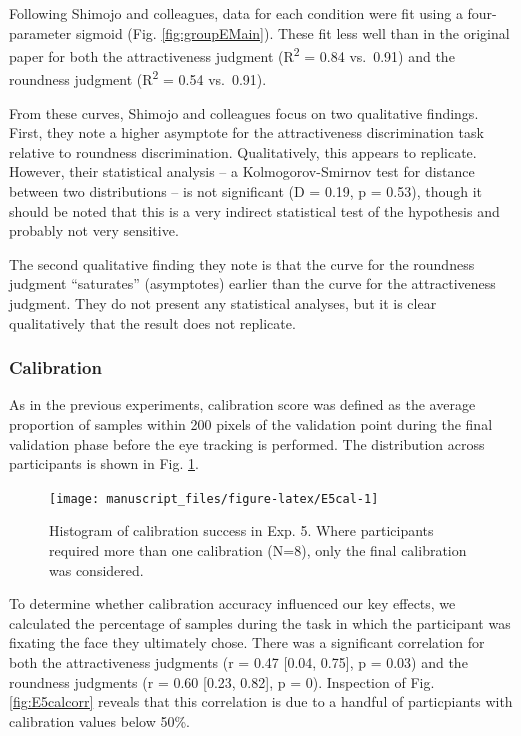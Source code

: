\documentclass[
  man,floatsintext]{apa6}
\begin{document}
Following Shimojo and colleagues, data for each condition were fit using a four-parameter sigmoid (Fig. \ref{fig:groupEMain}). These fit less well than in the original paper for both the attractiveness judgment (R\textsuperscript{2} = 0.84 vs.~0.91) and the roundness judgment (R\textsuperscript{2} = 0.54 vs.~0.91).

From these curves, Shimojo and colleagues focus on two qualitative findings. First, they note a higher asymptote for the attractiveness discrimination task relative to roundness discrimination. Qualitatively, this appears to replicate. However, their statistical analysis -- a Kolmogorov-Smirnov test for distance between two distributions -- is not significant (D = 0.19, p = 0.53), though it should be noted that this is a very indirect statistical test of the hypothesis and probably not very sensitive.

The second qualitative finding they note is that the curve for the roundness judgment ``saturates'' (asymptotes) earlier than the curve for the attractiveness judgment. They do not present any statistical analyses, but it is clear qualitatively that the result does not replicate.

\hypertarget{calibration-5}{%
\subsubsection{Calibration}\label{calibration-5}}

As in the previous experiments, calibration score was defined as the average proportion of samples within 200 pixels of the validation point during the final validation phase before the eye tracking is performed. The distribution across participants is shown in Fig. \ref{fig:E5cal}.


\begin{figure}
\texttt{[image: manuscript\_files/figure-latex/E5cal-1]} \caption{Histogram of calibration success in Exp. 5. Where participants required more than one calibration (N=8), only the final calibration was considered.}\label{fig:E5cal}
\end{figure}

To determine whether calibration accuracy influenced our key effects, we calculated the percentage of samples during the task in which the participant was fixating the face they ultimately chose. There was a significant correlation for both the attractiveness judgments (r = 0.47 {[}0.04, 0.75{]}, p = 0.03) and the roundness judgments (r = 0.60 {[}0.23, 0.82{]}, p = 0). Inspection of Fig. \ref{fig:E5calcorr} reveals that this correlation is due to a handful of particpiants with calibration values below 50\%.
\end{document}
